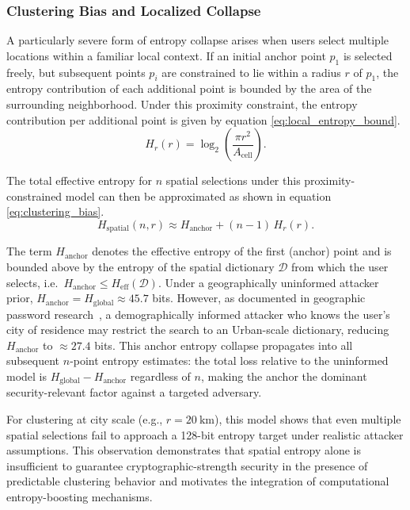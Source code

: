 \documentclass[journal,article,submit,pdftex,moreauthors]{Definitions/mdpi}
\newcommand{\add}[1]{#1}
\newcommand{\add}[1]{\added{#1}}
\begin{document}
\subsubsection{Clustering Bias and Localized Collapse}
\label{sec:clustering}

A particularly severe form of entropy collapse arises when users select multiple locations within a familiar local context. If an initial anchor point $p_1$ is selected freely, but subsequent points $p_i$ are constrained to lie within a radius $r$ of $p_1$, the entropy contribution of each additional point is bounded by the area of the surrounding neighborhood. Under this proximity constraint, the entropy contribution per additional point is given by equation \ref{eq:local_entropy_bound}.
\begin{equation}
H_r(r) = \log_2\!\left(\frac{\pi r^2}{A_{\text{cell}}}\right).
\label{eq:local_entropy_bound}
\end{equation}

The total effective entropy for $n$ spatial selections under this proximity-constrained model can then be approximated as shown in equation \ref{eq:clustering_bias}.
\begin{equation}
H_{\text{spatial}}(n,r) \approx H_{\text{anchor}} + (n-1)\,H_r(r).
\label{eq:clustering_bias}
\end{equation}

\add{The term $H_{\text{anchor}}$ denotes the effective entropy of the first (anchor) point and is bounded above by the entropy of the spatial dictionary $\mathcal{D}$ from which the user selects, i.e.\ $H_{\text{anchor}} \le H_{\text{eff}}(\mathcal{D})$. Under a geographically uninformed attacker prior, $H_{\text{anchor}} = H_{\text{global}} \approx 45.7$ bits. However, as documented in geographic password research~\cite{Sun2012, Thorpe2013, AlAmeen2014}, a demographically informed attacker who knows the user's city of residence may restrict the search to an Urban-scale dictionary, reducing $H_{\text{anchor}}$ to $\approx 27.4$ bits. This anchor entropy collapse propagates into all subsequent $n$-point entropy estimates: the total loss relative to the uninformed model is $H_{\text{global}} - H_{\text{anchor}}$ regardless of $n$, making the anchor the dominant security-relevant factor against a targeted adversary.}

For clustering at city scale (e.g., $r = 20~\text{km}$), this model shows that even multiple spatial selections fail to approach a 128-bit entropy target under realistic attacker assumptions. This observation demonstrates that spatial entropy alone is insufficient to guarantee cryptographic-strength security in the presence of predictable clustering behavior and motivates the integration of computational entropy-boosting mechanisms.
\end{document}
